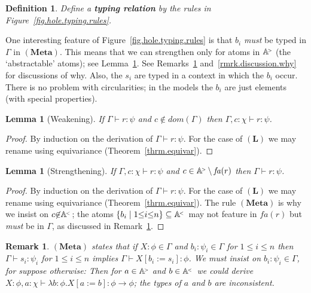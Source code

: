 \documentclass[submission,copyright]{eptcs}
\newtheorem{lemm}[thrm]{Lemma}
\newtheorem{defn}[thrm]{Definition}
\newtheorem{rmrk}[thrm]{Remark}
\newcommand{\deffont}[1]{\textbf{#1}}
\newcommand{\f}[1]{\ensuremath{\text{$\mathit{#1}$}}}
\newcommand{\lam}[1]{\lambda{#1}.}
\newcommand{\rulefont}[1]{\ensuremath{(\mathbf{#1})}}
\newcommand{\ssm}{:=}
\newcommand{\dom}{\f{dom}}
\newcommand\fto{{\to}}
\newcommand{\fa}{\f{fa}}
\newcommand\cent{\vdash}
\newcommand\atomsdown{\mathbb A^{\hspace{-.3ex}{}_{{}^<}}}
\newcommand\atomsup{\mathbb A^{\hspace{-.3ex}{}_{{}^>}\!}} \newcommand\basesort{\tau}
\begin{document}
\begin{defn}
\label{defn.hole.typing.rules}
Define a \deffont{typing relation} by the rules in Figure~\ref{fig.hole.typing.rules}.
\end{defn}

One interesting feature of Figure~\ref{fig.hole.typing.rules} is that $b_i$ \emph{must} be typed in $\Gamma$ in \rulefont{Meta}.
This means that we can strengthen only for atoms in $\atomsup$ (the `abstractable' atoms); see Lemma~\ref{lemm.holes.strong}.
See Remarks~\ref{rmrk.why.down} and~\ref{rmrk.discussion.why} for discussions of why.
Also, the $s_i$ are typed in a context in which the $b_i$ occur.
There is no problem with circularities; in the models the $b_i$ are just elements (with special properties).


\begin{lemm}[Weakening]
\label{lemm.holes.weaken}
If $\Gamma\cent r:\psi$ and $c\not\in\dom(\Gamma)$ then $\Gamma,c{:}\chi\cent r:\psi$.
\end{lemm}
\begin{proof}
By induction on the derivation of $\Gamma\cent r:\psi$.
For the case of \rulefont{L} we may rename using equivariance (Theorem~\ref{thrm.equivar}).
\end{proof} 

\begin{lemm}[Strengthening]
\label{lemm.holes.strong}
If $\Gamma,c{:}\chi\cent r:\psi$ and $c\in\atomsup\setminus\fa(r)$ then $\Gamma\cent r:\psi$.
\end{lemm}
\begin{proof}
By induction on the derivation of $\Gamma\cent r:\psi$.
For the case of \rulefont{L} we may rename using equivariance (Theorem~\ref{thrm.equivar}).
The rule \rulefont{Meta} is why we insist on $c{\not\in}\atomsdown$; the atoms $\{b_i\mid 1{\leq}i{\leq}n\}\subseteq\atomsdown$ may not feature in $\fa(r)$ but \emph{must} be in $\Gamma$, as discussed in Remark~\ref{rmrk.why.down}.
\end{proof} 

\begin{rmrk}
\label{rmrk.why.down}
\rulefont{Meta} states that if $X{:}\phi\in\Gamma$ and $b_i{:}\psi_i\in\Gamma$ for $1{\leq}i{\leq}n$ then $\Gamma\cent s_i:\psi_i$ for $1{\leq}i{\leq}n$ implies $\Gamma\cent X[b_i{\ssm}s_i]:\phi$.
We must insist on $b_i{:}\psi_i\in\Gamma$, for suppose otherwise: 
Then for $a\in\atomsup$ and $b\in\atomsdown$ we could derive $X{:}\phi,a{:}\chi\cent \lam{b{:}\phi}X[a\ssm b]:\phi\fto\phi$; the types of $a$ and $b$ are inconsistent.
\end{rmrk}
\end{document}
